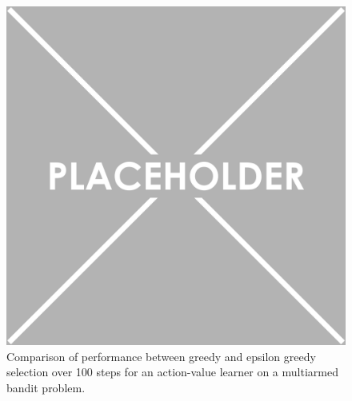 

\begin{figure}[h]
\includegraphics{Bandit100.png}
\caption{Comparison of performance between greedy and epsilon greedy selection over 100 steps for an action-value learner on a multiarmed bandit problem.}
\label{fig:Bandit100}
\end{figure}